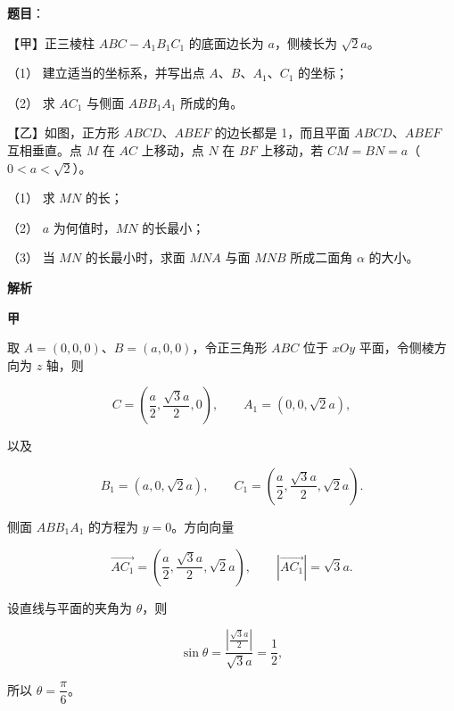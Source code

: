 \begin{answer}

\textbf{题目}：

【甲】正三棱柱 $ABC-A_1B_1C_1$ 的底面边长为 $a$，侧棱长为 $\sqrt2a$。
\nopagebreak[4]
\begin{center}\end{center}
\nopagebreak[4]
（1） 建立适当的坐标系，并写出点 $A\text{、}B\text{、}A_1\text{、}C_1$ 的坐标；

（2） 求 $AC_1$ 与侧面 $ABB_1A_1$ 所成的角。

【乙】如图，正方形 $ABCD\text{、}ABEF$ 的边长都是 1，而且平面 $ABCD\text{、}ABEF$ 互相垂直。点 $M$ 在 $AC$ 上移动，点 $N$ 在 $BF$ 上移动，若 $CM=BN=a$（$0<a<\sqrt2$）。
\nopagebreak[4]
\begin{center}\end{center}
\nopagebreak[4]
（1） 求 $MN$ 的长；

（2） $a$ 为何值时，$MN$ 的长最小；

（3） 当 $MN$ 的长最小时，求面 $MNA$ 与面 $MNB$ 所成二面角 $\alpha$ 的大小。


\textbf{解析}

\textbf{甲}


取 $A=(0,0,0)$、$B=(a,0,0)$，令正三角形 $ABC$ 位于 $xOy$ 平面，令侧棱方向为 $z$ 轴，则

\nopagebreak[4]
\[
C=\left(\frac a2,\frac{\sqrt3a}{2},0\right),\qquad
A_1=(0,0,\sqrt2a),
\]

以及

\nopagebreak[4]
\[
B_1=(a,0,\sqrt2a),\qquad
C_1=\left(\frac a2,\frac{\sqrt3a}{2},\sqrt2a\right).
\]


侧面 $ABB_1A_1$ 的方程为 $y=0$。方向向量

\nopagebreak[4]
\[
\overrightarrow{AC_1}
=\left(\frac a2,\frac{\sqrt3a}{2},\sqrt2a\right),
\qquad
|\overrightarrow{AC_1}|=\sqrt3a.
\]

设直线与平面的夹角为 $\theta$，则

\nopagebreak[4]
\[
\sin\theta
=\frac{\left|\frac{\sqrt3a}{2}\right|}{\sqrt3a}
=\frac12,
\]

所以 $\theta=\dfrac\pi6$。


\end{answer}
